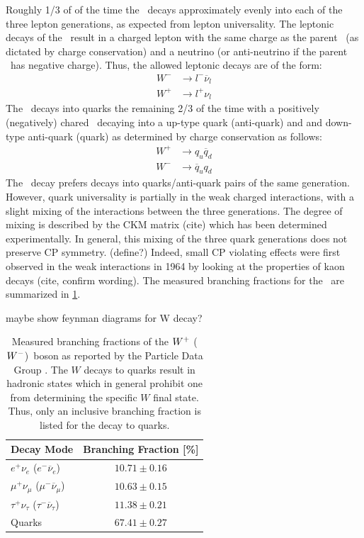 Roughly 1/3 of of the time the \dubya~decays approximately 
evenly into each of the three lepton generations,
as expected from lepton universality.
The leptonic decays of the \dubya~result in a charged lepton 
with the same charge as the parent \dubya~(as dictated by charge conservation)
and a neutrino (or anti-neutrino if the parent \dubya~has negative charge).
Thus, the allowed leptonic decays are of the form:
\begin{align*}
W^{-} &\rightarrow l^{-} \overline{\nu}_l \\
W^{+} &\rightarrow l^{+} \nu_l
\end{align*}
The \dubya~decays into quarks the remaining 2/3 of the time with a positively
(negatively) chared \dubya~decaying into a up-type quark (anti-quark) and 
and down-type anti-quark (quark) as determined by charge conservation as follows:
\begin{align*}
W^{+} &\rightarrow q_u \overline{q}_d \\
W^{-} &\rightarrow \overline{q}_u q_d
\end{align*}
The \dubya~decay prefers decays into quarks/anti-quark pairs of the same generation.
However, quark universality is partially in the weak charged interactions, with
a slight mixing of the interactions between the three generations. The 
degree of mixing is described by the CKM matrix (cite) which has been
determined experimentally.  In general, this mixing of the three quark 
generations does not preserve CP symmetry. (define?) Indeed, small CP
violating effects were first observed in the weak interactions in 1964
by looking at the properties of kaon decays (cite, confirm wording).
The measured branching fractions for the \dubya~are 
summarized in \tab\ref{tab:theory_wdecay}.

maybe show feynman diagrams for W decay?

\begin{table}[ht]
\centering
\begin{tabular}{l|c}
Decay Mode &  Branching Fraction [\%]\\
\hline
$e^+\nu_e$ ($e^-\overline{\nu}_e$) & $10.71 \pm 0.16$ \\
$\mu^+\nu_{\mu}$ ($\mu^-\overline{\nu}_{\mu}$) & $10.63 \pm 0.15$\\
$\tau^+\nu_{\tau}$ ($\tau^-\overline{\nu}_{\tau}$) & $11.38 \pm 0.21$\\
Quarks & $67.41 \pm 0.27$\\
\end{tabular}
\caption{Measured branching fractions of the $W^+$ ($W^-$)~boson 
as reported by the Particle Data Group \cite{PDG:2014}.  The $W$ decays
to quarks result in hadronic states which in general prohibit
one from determining the specific $W$ final state. Thus, only 
an inclusive branching fraction is listed for the decay to quarks.}
\label{tab:theory_wdecay}
\end{table}


